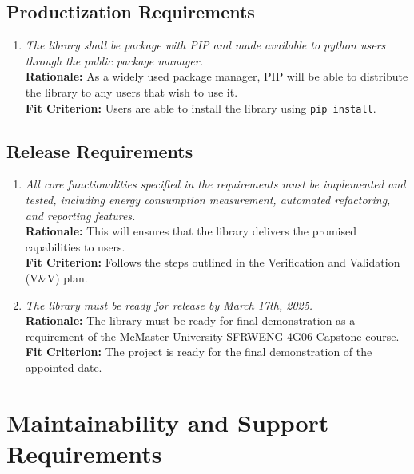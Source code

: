 \documentclass[12pt]{article}
\begin{document}
\subsection{Productization Requirements}
\begin{enumerate}[label=OER-PR \arabic*., wide=0pt, leftmargin=*]
	\item \emph{The library shall be package with PIP and made available to python users through the public package manager.}\\
    {\bf Rationale:} As a widely used package manager, PIP will be able to distribute the library to any users that wish to use it.\\
    {\bf Fit Criterion:} Users are able to install the library using \texttt{pip install}. 
\end{enumerate}

\subsection{Release Requirements}
\begin{enumerate}[label=OER-RL \arabic*., wide=0pt, leftmargin=*]
	\item \emph{All core functionalities specified in the requirements must be implemented and tested, including energy consumption measurement, automated refactoring, and reporting features.}\\
    {\bf Rationale:} This will ensures that the library delivers the promised capabilities to users.\\
    {\bf Fit Criterion:} Follows the steps outlined in the Verification and Validation (V\&V) plan.  
  \item \emph{The library must be ready for release by March 17th, 2025.}\\
    {\bf Rationale:} The library must be ready for final demonstration as a requirement of the McMaster University SFRWENG 4G06 Capstone course.\\
    {\bf Fit Criterion:} The project is ready for the final demonstration of the appointed date.
\end{enumerate}

\section{Maintainability and Support Requirements}
\end{document}
